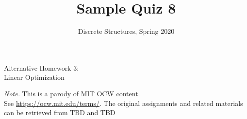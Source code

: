 \documentclass[jou]{apa6}
\title{Sample Quiz 8}
\author{Discrete Structures, Spring 2020}
\affiliation{RBS}
\begin{document}
\twocolumn
\thispagestyle{empty}

\begin{center}
{\Large Alternative Homework 3:}\\
{\Large Linear Optimization}
\end{center}


\begin{changemargin}{10pt}{10pt}
{\footnotesize
{\em Note.} This is a parody of MIT OCW content.\\
See \url{https://ocw.mit.edu/terms/}. 
The original assignments and related materials can be retrieved from 
TBD and TBD\\
}
\end{changemargin}






\end{document}
